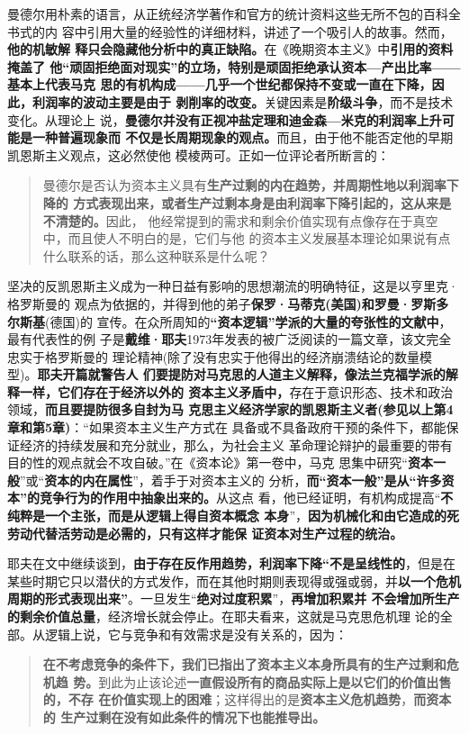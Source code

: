 曼德尔用朴素的语言，从正统经济学著作和官方的统计资料这些无所不包的百科全书式的内
容中引用大量的经验性的详细材料，讲述了一个吸引人的故事。然而，\textbf{他的机敏解
  释只会隐藏他分析中的真正缺陷。}在《晚期资本主义》中\textbf{引用的资料掩盖了
  他“顽固拒绝面对现实”的立场，特别是顽固拒绝承认资本—产出比率——基本上代表马克
  思的有机构成——几乎一个世纪都保持不变或一直在下降，因此，利润率的波动主要是由于
  剥削率的改变。}关键因素是\textbf{阶级斗争}，而不是技术变化。从理论上
说，\textbf{曼德尔并没有正视冲盐定理和迪金森—米克的利润率上升可能是一种普遍现象而
  不仅是长周期现象的观点。}而且，由于他不能否定他的早期凯恩斯主义观点，这必然使他
模棱两可。正如一位评论者所断言的：
\begin{quotation}
  曼德尔是否认为资本主义具有\textbf{生产过剩的内在趋势，并周期性地以利润率下降的
    方式表现出来，或者生产过剩本身是由利润率下降引起的，这从来是不清楚的。}因此，
  他经常提到的需求和剩余价值实现有点像存在于真空中，而且使人不明白的是，它们与他
  的资本主义发展基本理论如果说有点什么联系的话，那么这种联系是什么呢？
\end{quotation}

坚决的反凯恩斯主义成为一种日益有影响的思想潮流的明确特征，这是以亨里克·格罗斯曼的
观点为依据的，并得到他的弟子\textbf{保罗·马蒂克(美国)和罗曼·罗斯多尔斯基}(德国)的
宣传。在众所周知的\textbf{“资本逻辑”学派的大量的夸张性的文献中}，最有代表性的例
子是\textbf{戴维·耶夫}1973年发表的被广泛阅读的一篇文章，该文完全忠实于格罗斯曼的
理论精神(除了没有忠实于他得出的经济崩溃结论的数量模型)。\textbf{耶夫开篇就警告人
  们要提防对马克思的人道主义解释，像法兰克福学派的解释一样，它们存在于经济以外的
  资本主义矛盾中，}存在于意识形态、技术和政治领域，\textbf{而且要提防很多自封为马
  克思主义经济学家的凯恩斯主义者(参见以上第4章和第5章)}：“如果资本主义生产方式在
具备或不具备政府干预的条件下，都能保证经济的持续发展和充分就业，那么，为社会主义
革命理论辩护的最重要的带有目的性的观点就会不攻自破。”在《资本论》第一卷中，马克
思集中研究“\textbf{资本一般}”或“\textbf{资本的内在属性}”，着手于对资本主义的
分析，\textbf{而“资本一般”是从“许多资本”的竞争行为的作用中抽象出来的。}从这点
看，他已经证明，有机构成提高“\textbf{不纯粹是一个主张，而是从逻辑上得自资本概念
  本身}”，\textbf{因为机械化和由它造成的死劳动代替活劳动是必需的，只有这样才能保
  证资本对生产过程的统治。}

耶夫在文中继续谈到，\textbf{由于存在反作用趋势，利润率下降“不是呈线性的}，但是在
某些时期它只以潜伏的方式发作，而在其他时期则表现得或强或弱，并\textbf{以一个危机
  周期的形式表现出来”}。一旦发生“\textbf{绝对过度积累}”，\textbf{再增加积累并
  不会增加所生产的剩余价值总量}，经济增长就会停止。在耶夫看来，这就是马克思危机理
论的全部。从逻辑上说，它与竞争和有效需求是没有关系的，因为：
\begin{quotation}
  \textbf{在不考虑竞争的条件下，我们已指出了资本主义本身所具有的生产过剩和危机趋
    势。}到此为止该论述\textbf{一直假设所有的商品实际上是以它们的价值出售的，不存
    在价值实现上的困难}；这样得出的是\textbf{资本主义危机趋势}，\textbf{而资本的
    生产过剩在没有如此条件的情况下也能推导出。}
\end{quotation}

